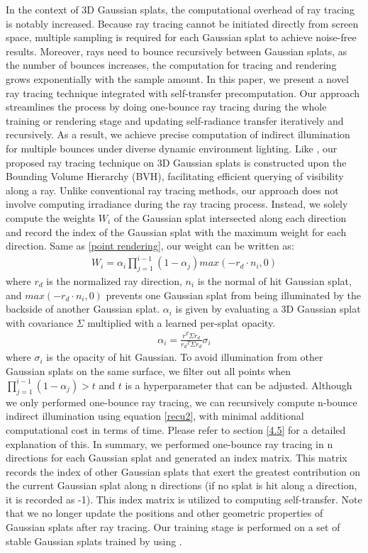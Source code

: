  In the context of 3D Gaussian splats, the computational overhead of ray tracing is notably increased. Because ray tracing cannot be initiated directly from screen space, multiple sampling is required for each Gaussian splat to achieve noise-free results. Moreover, rays need to bounce recursively between Gaussian splats, as the number of bounces increases, the computation for tracing and rendering grows exponentially with the sample amount. In this paper, we present a novel ray tracing technique integrated with self-transfer precomputation. Our approach streamlines the process by doing one-bounce ray tracing during the whole training or rendering stage and updating self-radiance transfer iteratively and recursively. As a result, we achieve precise computation of indirect illumination for multiple bounces under diverse dynamic environment lighting. Like \cite{gao2023relightable,liang2023gsir,chen2023gaussianeditor}, our proposed ray tracing technique on 3D Gaussian splats is constructed upon the Bounding Volume Hierarchy (BVH), facilitating efficient querying of visibility along a ray. 
Unlike conventional ray tracing methods, our approach does not involve computing irradiance during the ray tracing process. Instead, we solely compute the weights $W_i$ of the Gaussian splat intersected along each direction and record the index of the Gaussian splat with the maximum weight for each direction. Same as \ref{point rendering}, our weight can be written as:
\begin{align}
    W_i=\alpha_{i}\prod_{j=1}^{i-1}(1-\alpha_{j})max(-r_d \cdot n_i,0)  \label{weight}
\end{align}
where $r_d$ is the normalized ray direction, $n_i$ is the normal of hit Gaussian splat, and $max(-r_d \cdot n_i,0)$ prevents one Gaussian splat from being illuminated by the backside of another Gaussian splat. $\alpha_{i}$ is given by evaluating a 3D Gaussian splat with covariance $\Sigma$ multiplied with a learned per-splat opacity. 
\begin{align}
    \alpha_{i}=\frac{r^T\Sigma r_d}{{r_d}^T\Sigma r_d}\sigma_i    
\end{align}
where $\sigma_i$ is the opacity of hit Gaussian. To avoid illumination from other Gaussian splats on the same surface, we filter out all points when $\prod_{j=1}^{i-1}(1-\alpha_{j})>t$ and $t$ is a hyperparameter that can be adjusted. Although we only performed one-bounce ray tracing, we can recursively compute n-bounce indirect illumination using equation \ref{recu2}, with minimal additional computational cost in terms of time. Please refer to section \ref{4.5} for a detailed explanation of this. In summary, we performed one-bounce ray tracing in n directions for each Gaussian splat and generated an index matrix. This matrix records the index of other Gaussian splats that exert the greatest contribution on the current Gaussian splat along n directions (if no splat is hit along a direction, it is recorded as -1). This index matrix is utilized to computing self-transfer. Note that we no longer update the positions and other geometric properties of Gaussian splats after ray tracing. Our training stage is performed on a set of stable Gaussian splats trained by using \cite{3dgs}.
